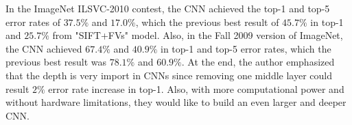 \documentclass[12pt]{article}
\begin{document}
\bigskip
\noindent
In the ImageNet ILSVC-2010 contest, the CNN	achieved the top-1 and top-5 error rates of $37.5\%$ and $17.0\%$, which the previous best result of $45.7\%$ in top-1 and $25.7\%$ from "SIFT+FVs" model\citep{alexnet}. Also, in the Fall 2009 version of ImageNet, the CNN achieved $67.4\%$ and $40.9\%$ in top-1 and top-5 error rates, which the previous best result was $78.1\%$ and $60.9\%$\citep{alexnet}. At the end, the author  emphasized that the depth is very import in CNNs since removing one middle layer could result $2\%$ error rate increase in top-1\citep{alexnet}. Also, with more computational power and without hardware limitations, they would like to build an even larger and deeper CNN.



{}
\end{document}
